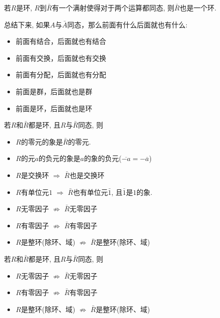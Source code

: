 \begin{Theorem}
若$R$是环, $R$到$\bar{R}$有一个满射使得对于两个运算都同态, 则$\bar{R}$也是一个环.
\end{Theorem}

\begin{Remark}
总结下来, 如果$A$与$\bar{A}$同态，那么前面有什么后面就也有什么:
\begin{itemize}
	\item 前面有结合，后面就也有结合
	\item 前面有交换，后面就也有交换
	\item 前面有分配，后面就也有分配
	\item 前面是群，后面就也是群
	\item 前面是环，后面就也是环
\end{itemize}
\end{Remark}

\begin{Theorem}
若$R$和$\bar{R}$都是环, 且$R$与$\bar{R}$同态, 则
\begin{itemize}
	\item $R$的零元的象是$\bar{R}$的零元.
	\item $R$的元$a$的负元的象是$a$的象的负元{($\overline{-a} = -\overline{a}$)}
	\item $R$是交换环 $\Rightarrow$ $\bar{R}$也是交换环
	\item $R$有单位元$\mathfrak{1}$ $\Rightarrow$ $\bar{R}$也有单位元$\bar{\mathfrak{1}}$, 且$\bar{\mathfrak{1}}$是$\mathfrak{1}$的象.
	\item $R$无零因子 $\not\Rightarrow$ $\bar{R}$无零因子
	\item $R$有零因子 $\not\Rightarrow$ $\bar{R}$有零因子
	\item $R$是整环(除环、域) $\not\Rightarrow$ $\bar{R}$是整环(除环、域)
\end{itemize}
\end{Theorem}

\begin{Proposition}
若$R$和$\bar{R}$都是环, 且$R$与$\bar{R}$同态, 则
\begin{itemize}
	\item $R$无零因子 $\not\Rightarrow$ $\bar{R}$无零因子
	\item $R$有零因子 $\not\Rightarrow$ $\bar{R}$有零因子
	\item $R$是整环(除环、域) $\not\Rightarrow$ $\bar{R}$是整环(除环、域)
\end{itemize}
\end{Proposition}

